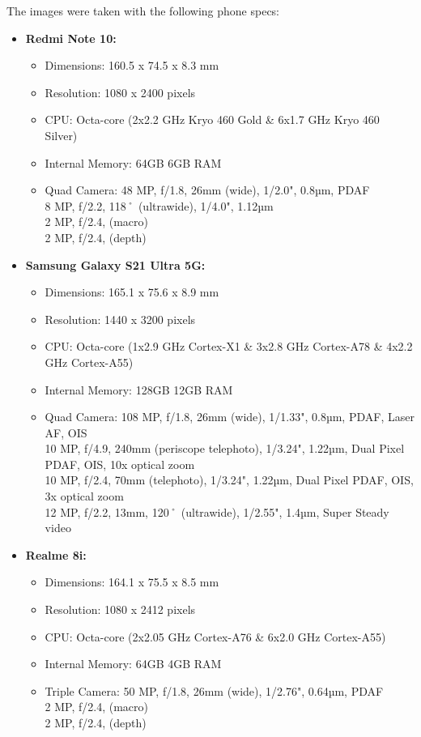 The images were taken with the following phone specs:
\begin{itemize} 
    \item \textbf{Redmi Note 10:}
        \begin{itemize}
            \item Dimensions: 160.5 x 74.5 x 8.3 mm
            \item Resolution: 1080 x 2400 pixels
            \item CPU: Octa-core (2x2.2 GHz Kryo 460 Gold \& 6x1.7 GHz Kryo 460 Silver)
            \item Internal Memory: 64GB 6GB RAM
            \item Quad Camera: 48 MP, f/1.8, 26mm (wide), 1/2.0", 0.8µm, PDAF\\
            8 MP, f/2.2, 118˚ (ultrawide), 1/4.0", 1.12µm\\
            2 MP, f/2.4, (macro)\\
            2 MP, f/2.4, (depth)
        \end{itemize}
        
    \item \textbf{Samsung Galaxy S21 Ultra 5G:}
        \begin{itemize}
            \item Dimensions: 165.1 x 75.6 x 8.9 mm
            \item Resolution: 1440 x 3200 pixels
            \item CPU: Octa-core (1x2.9 GHz Cortex-X1 \& 3x2.8 GHz Cortex-A78 \& 4x2.2 GHz Cortex-A55)
            \item Internal Memory: 128GB 12GB RAM
            \item Quad Camera: 108 MP, f/1.8, 26mm (wide), 1/1.33", 0.8µm, PDAF, Laser AF, OIS\\
            10 MP, f/4.9, 240mm (periscope telephoto), 1/3.24", 1.22µm, Dual Pixel PDAF, OIS, 10x optical zoom\\
            10 MP, f/2.4, 70mm (telephoto), 1/3.24", 1.22µm, Dual Pixel PDAF, OIS, 3x optical zoom\\
            12 MP, f/2.2, 13mm, 120˚ (ultrawide), 1/2.55", 1.4µm, Super Steady video
        \end{itemize}

    \item \textbf{Realme 8i:}
        \begin{itemize}
            \item Dimensions: 164.1 x 75.5 x 8.5 mm
            \item Resolution: 1080 x 2412 pixels
            \item CPU: Octa-core (2x2.05 GHz Cortex-A76 \& 6x2.0 GHz Cortex-A55)
            \item Internal Memory: 64GB 4GB RAM
            \item Triple Camera: 50 MP, f/1.8, 26mm (wide), 1/2.76", 0.64µm, PDAF\\
            2 MP, f/2.4, (macro)\\
            2 MP, f/2.4, (depth)
        \end{itemize}
\end{itemize}


